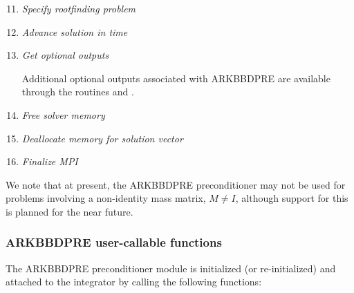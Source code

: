 \documentclass[letterpaper,10pt,english]{sphinxmanual}
\begin{document}
\begin{enumerate}
\setcounter{enumi}{10}
\item {} 
\emph{Specify rootfinding problem}

\item {} 
\emph{Advance solution in time}

\item {} 
\emph{Get optional outputs}

Additional optional outputs associated with ARKBBDPRE are
available through the routines
{\hyperref[c_interface/Preconditioners:ARKBBDPrecGetWorkSpace]{}} and
{\hyperref[c_interface/Preconditioners:ARKBBDPrecGetNumGfnEvals]{}}.

\item {} 
\emph{Free solver memory}

\item {} 
\emph{Deallocate memory for solution vector}

\item {} 
\emph{Finalize MPI}

\end{enumerate}

We note that at present, the ARKBBDPRE preconditioner may not be used
for problems involving a non-identity mass matrix, $M\ne I$,
although support for this is planned for the near future.


\subsubsection{ARKBBDPRE user-callable functions}
\label{c_interface/Preconditioners:arkbbdpre-user-callable-functions}
The ARKBBDPRE preconditioner module is initialized (or re-initialized)
and attached to the integrator by calling the following functions:
\end{document}
